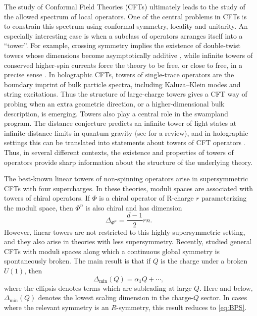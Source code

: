\documentclass[a4paper,11pt]{article}
\newcommand\Dm{\Delta_{\min}}
\begin{document}
The study of Conformal Field Theories (CFTs) ultimately leads to the study of the allowed spectrum of local operators. One of the central problems in CFTs is to constrain this spectrum using conformal symmetry, locality and unitarity. An especially interesting case is when a subclass of operators arranges itself into a ``tower''. For example, crossing symmetry implies the existence of double-twist towers whose dimensions become asymptotically additive \cite{Komargodski:2012ek,Fitzpatrick:2012yx,Caron-Huot:2017vep}, while infinite towers of conserved higher-spin currents force the theory to be free, or close to free, in a precise sense \cite{Maldacena:2011jn,Maldacena:2012sf}. In holographic CFTs, towers of single-trace operators are the boundary imprint of bulk particle spectra, including Kaluza--Klein modes and string excitations. Thus the structure of large-charge towers gives a CFT way of probing when an extra geometric direction, or a higher-dimensional bulk description, is emerging. Towers also play a central role in the swampland program. The distance conjecture predicts an infinite tower of light states at infinite-distance limits in quantum gravity \cite{Vafa:2005ui,Ooguri:2006in} (see \cite{Palti:2019pca} for a review), and in holographic settings this can be translated into statements about towers of CFT operators \cite{Perlmutter:2020buo,Baume:2023msm,Baume:2020dqd}. Thus, in several different contexts, the existence and properties of towers of operators provide sharp information about the structure of the underlying theory.

The best-known linear towers of non-spinning operators arise in supersymmetric CFTs with four supercharges. In these theories, moduli spaces are associated with towers of chiral operators. If $\Phi$ is a chiral operator of R-charge $r$ parameterizing the moduli space, then $\Phi^n$ is also chiral and has dimension
\begin{equation}\label{eq:BPS}
  \Delta_{\Phi^n}=\frac{d-1}{2}rn.
\end{equation}
However, linear towers are not restricted to this highly supersymmetric setting, and they also arise in theories with less supersymmetry. Recently, \cite{Cuomo:2024fuy} studied general CFTs with moduli spaces along which a continuous global symmetry is spontaneously broken. The main result is that if $Q$ is the charge under a broken $U(1)$, then 
\begin{equation}\label{eq:large-charge-Dm}
  \Dm(Q)=\alpha_1 Q+\cdots,
\end{equation}
where the ellipsis denotes terms which are subleading at large $Q$. Here and below, $\Dm(Q)$ denotes the lowest scaling dimension in the charge-$Q$ sector. In cases where the relevant symmetry is an $R$-symmetry, this result reduces to \eqref{eq:BPS}.
\end{document}
